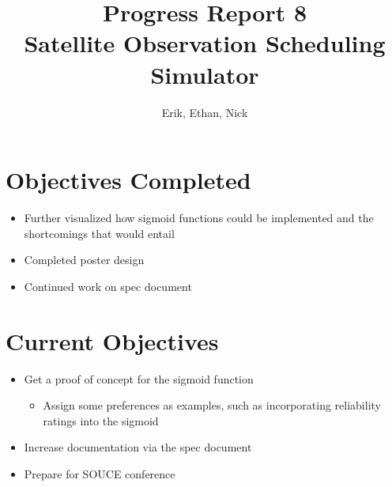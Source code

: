 \documentclass{article}
\title{Progress Report 8\\ Satellite Observation Scheduling Simulator}
\author{Erik, Ethan, Nick}
\begin{document}
\maketitle

\section{Objectives Completed}

\begin{itemize}
	\item Further visualized how sigmoid functions could be implemented and the shortcomings that would entail
	\item Completed poster design
	\item Continued work on spec document
\end{itemize}

\section{Current Objectives}

\begin{itemize}
  \item Get a proof of concept for the sigmoid function
  \begin{itemize}
  \item Assign some preferences as examples, such as incorporating reliability ratings into the sigmoid
  \end{itemize}
  \item Increase documentation via the spec document
  \item Prepare for SOUCE conference
\end{itemize}
\end{document}

